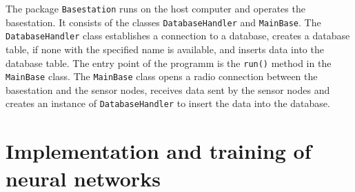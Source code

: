 \documentclass[12pt,a4paper]{scrartcl}
\begin{document}
The package \texttt{Basestation} runs on the host computer and operates the basestation.
It consists of the classes \texttt{Database\-Handler} and \texttt{MainBase}.
The \texttt{Database\-Handler} class establishes a connection to a database, creates a database table, if none with the specified name is available, and inserts data into the database table.
The entry point of the programm is the \texttt{run()} method in the \texttt{MainBase} class. The \texttt{MainBase} class opens a radio connection between the basestation and the sensor nodes, receives data sent by the sensor nodes and creates an instance of \texttt{Database\-Handler} to insert the data into the database.



%

\newpage


\section*{Implementation and training of neural networks}
\end{document}
